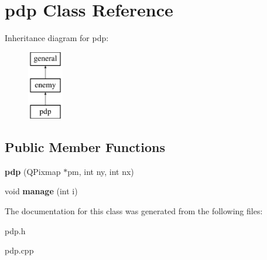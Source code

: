 \hypertarget{classpdp}{\section{pdp \-Class \-Reference}
\label{classpdp}
}
\-Inheritance diagram for pdp\-:\begin{figure}[H]
\begin{center}
\leavevmode
\includegraphics[height=3.000000cm]{classpdp}
\end{center}
\end{figure}
\subsection*{\-Public \-Member \-Functions}
\begin{DoxyCompactItemize}
\item 
\hypertarget{classpdp_a6b4aa4153fc5458b2972a39c6d920a46}{{\bfseries pdp} (\-Q\-Pixmap $\ast$pm, int ny, int nx)}\label{classpdp_a6b4aa4153fc5458b2972a39c6d920a46}

\item 
\hypertarget{classpdp_aae904ff0b9f039a022308e1e7c4d2b74}{void {\bfseries manage} (int i)}\label{classpdp_aae904ff0b9f039a022308e1e7c4d2b74}

\end{DoxyCompactItemize}


\-The documentation for this class was generated from the following files\-:\begin{DoxyCompactItemize}
\item 
pdp.\-h\item 
pdp.\-cpp\end{DoxyCompactItemize}
